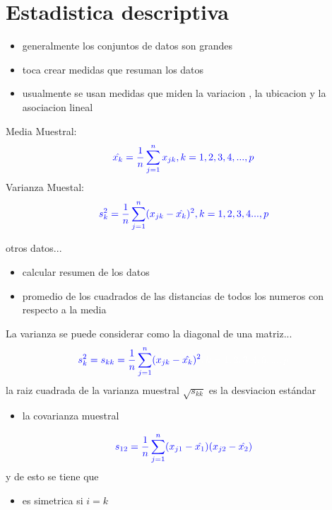 \documentclass[10pt,a4paper]{article} %
\begin{document}
    \section{Estadistica descriptiva}
        \begin{itemize}
            \item {generalmente los conjuntos de datos son grandes}
            \item {toca crear medidas que resuman los datos}
            \item { usualmente se usan medidas que miden \color{red} la
                variacion , la ubicacion y la asociacion lineal \color{white}    }
        \end{itemize}

        Media Muestral:
        \\
        \begin{equation}
            \color{blue} \hat{x_k} = \frac{1}{n}\sum_{j=1}^{n} x_{jk} ,
            k=1,2,3,4,...,p \color{white}
        \end{equation}
        Varianza Muestal:
        \\
        \begin{equation}
            \color{blue} s_k ^{2}  = \frac{1}{n} \sum_{j=1}^{n}(x_{jk} -
            \hat{x_k} )^{2}  ,
            k=1,2,3,4 ... , p \color{white}
        \end{equation}

        otros datos...
        \begin{itemize}
            \item {calcular resumen de los datos}
            \item {promedio de los cuadrados de las distancias de todos los
                numeros con respecto a la media}
        \end{itemize}

        La varianza se puede considerar como la diagonal de una matriz...
        \\
        \begin{equation}
            \color{blue} s_k ^{2}  = s_{kk} = \frac{1}{n} \sum_{j=1}^{n}(x_{jk}
            - \hat{x_k} ) ^{2}   \color{white}  , k = 1,2,3,4,5 , ... ,  p
        \end{equation}
        la raiz cuadrada de la varianza muestral $ \sqrt{s_{kk}}   $ es la
        desviacion estándar

        \begin{itemize}
            \item {la covarianza muestral}
        \end{itemize}
        \begin{equation}
            \color{blue} s_{12} = \frac{1}{n}\sum_{j=1}^{n}(x_{j1} - \hat{x_1}
            )(x_{j2} -
            \hat{x_2} ) \color{white}
        \end{equation}
        y de esto se tiene que
        \begin{itemize}
            \item {es simetrica si $ i = k  $ }
        \end{itemize}
\end{document}
